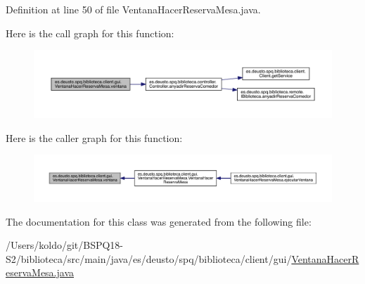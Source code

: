 Definition at line 50 of file Ventana\+Hacer\+Reserva\+Mesa.\+java.

Here is the call graph for this function\+:
\nopagebreak
\begin{figure}[H]
\begin{center}
\leavevmode
\includegraphics[width=350pt]{classes_1_1deusto_1_1spq_1_1biblioteca_1_1client_1_1gui_1_1_ventana_hacer_reserva_mesa_a02e760f41c682169da251b802cf65181_cgraph}
\end{center}
\end{figure}
Here is the caller graph for this function\+:
\nopagebreak
\begin{figure}[H]
\begin{center}
\leavevmode
\includegraphics[width=350pt]{classes_1_1deusto_1_1spq_1_1biblioteca_1_1client_1_1gui_1_1_ventana_hacer_reserva_mesa_a02e760f41c682169da251b802cf65181_icgraph}
\end{center}
\end{figure}


The documentation for this class was generated from the following file\+:\begin{DoxyCompactItemize}
\item 
/\+Users/koldo/git/\+B\+S\+P\+Q18-\/\+S2/biblioteca/src/main/java/es/deusto/spq/biblioteca/client/gui/\mbox{\hyperlink{_ventana_hacer_reserva_mesa_8java}{Ventana\+Hacer\+Reserva\+Mesa.\+java}}\end{DoxyCompactItemize}
